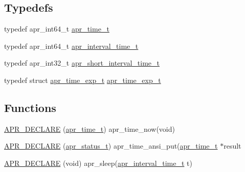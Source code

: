 \subsection*{Typedefs}
\begin{DoxyCompactItemize}
\item 
typedef apr\+\_\+int64\+\_\+t \mbox{\hyperlink{group__apr__time_gadb4bde16055748190eae190c55aa02bb}{apr\+\_\+time\+\_\+t}}
\item 
typedef apr\+\_\+int64\+\_\+t \mbox{\hyperlink{group__apr__time_gaae2129185a395cc393f76fabf4f43e47}{apr\+\_\+interval\+\_\+time\+\_\+t}}
\item 
typedef apr\+\_\+int32\+\_\+t \mbox{\hyperlink{group__apr__time_ga3e4663cc0d8b730902ff697c8d3f64be}{apr\+\_\+short\+\_\+interval\+\_\+time\+\_\+t}}
\item 
typedef struct \mbox{\hyperlink{structapr__time__exp__t}{apr\+\_\+time\+\_\+exp\+\_\+t}} \mbox{\hyperlink{group__apr__time_gae28f2767111a534f263ced95a28489b1}{apr\+\_\+time\+\_\+exp\+\_\+t}}
\end{DoxyCompactItemize}
\subsection*{Functions}
\begin{DoxyCompactItemize}
\item 
\mbox{\hyperlink{group__apr__time_ga0151b93f22f81f7b1af9bc4dfcd11f86}{A\+P\+R\+\_\+\+D\+E\+C\+L\+A\+RE}} (\mbox{\hyperlink{group__apr__time_gadb4bde16055748190eae190c55aa02bb}{apr\+\_\+time\+\_\+t}}) apr\+\_\+time\+\_\+now(void)
\item 
\mbox{\hyperlink{group__apr__time_ga57bfe39a9516843a151a65cd02f84616}{A\+P\+R\+\_\+\+D\+E\+C\+L\+A\+RE}} (\mbox{\hyperlink{group__apr__errno_gaf76ee4543247e9fb3f3546203e590a6c}{apr\+\_\+status\+\_\+t}}) apr\+\_\+time\+\_\+ansi\+\_\+put(\mbox{\hyperlink{group__apr__time_gadb4bde16055748190eae190c55aa02bb}{apr\+\_\+time\+\_\+t}} $\ast$result
\item 
\mbox{\hyperlink{group__apr__time_ga82e8a0064bc8dd25ef73f39ea428a585}{A\+P\+R\+\_\+\+D\+E\+C\+L\+A\+RE}} (void) apr\+\_\+sleep(\mbox{\hyperlink{group__apr__time_gaae2129185a395cc393f76fabf4f43e47}{apr\+\_\+interval\+\_\+time\+\_\+t}} t)
\end{DoxyCompactItemize}
